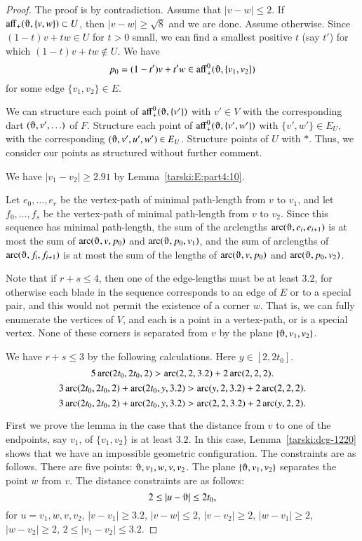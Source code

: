 \begin{proof}
The proof is by contradiction.  Assume that $|v-w|\le 2$.
If $\op{aff}_+(\orgn,\{v,w\})\subset U$, then $|v-w|\ge\sqrt8$ and
we are done.  Assume otherwise.  Since $(1-t)v + t w\in U$ for $t>0$
small, we can find a smallest positive $t$ (say $t'$) for which
$(1-t)v + t w\not\in U$.  We have
$$p_0 = (1-t') v + t' w \in \op{aff}_+^0(\orgn,\{v_1,v_2\})$$
for some edge $\{v_1,v_2\}\in E$.

We can structure each point of $\op{aff}^0_+(\orgn,\{v'\})$ with
$v'\in V$ with the corresponding dart $(\orgn,v',\ldots)$ of $F$.
Structure each point of $\op{aff}_+^0(\orgn,\{v',w'\})$ with
$\{v',w'\}\in E_U$, with the corresponding $(\orgn,v',u',w')\in E_U$.
Structure points of $U$ with $*$. Thus, we consider our points as
structured without further comment.


We have $|v_1-v_2|\ge2.91$ by Lemma~\ref{tarski:E:part4:10}.

Let $e_0,\ldots,e_r$ be the  vertex-path of minimal path-length from $v$ to
$v_1$, and let $f_0,\ldots,f_s$ be the  vertex-path of minimal path-length from
$v$ to $v_2$. Since this sequence has minimal path-length, the
sum of the arclengths $\arc(\orgn,e_i,e_{i+1})$ is at most the sum of 
$\arc(\orgn,v,p_0)$ and $\arc(\orgn,p_0,v_1)$, and the sum of arclengths of $\arc(\orgn,f_i,f_{i+1})$
is at most the sum of the lengths of $\arc(\orgn,v,p_0)$ and $\arc(\orgn,p_0,v_2)$.

Note that if $r+s\le4$, then one of the edge-lengths must be at
least $3.2$, for otherwise each blade in the sequence corresponds to
an 
edge of $E$ or to a special pair, and this would not permit
the existence of a corner $w$. That is, we can fully enumerate the
vertices of $V$, and each is a
point in a vertex-path, or is a special vertex.
None of these corners is separated from $v$ by the plane
$\{\orgn,v_1,v_2\}$.

We have $r+s\le3$ by the following calculations.  Here
$y\in[2,2t_0]$.
    $$5\operatorname{arc}(2t_0,2t_0,2) > \operatorname{arc}(2,2,3.2)+ 2 \operatorname{arc}(2,2,2).$$
    $$3\operatorname{arc}(2t_0,2t_0,2) + \operatorname{arc}(2t_0,y,3.2) > \operatorname{arc}(y,2,3.2) + 2 \operatorname{arc}(2,2,2).$$
    $$3\operatorname{arc}(2t_0,2t_0,2) + \operatorname{arc}(2t_0,y,3.2) > \operatorname{arc}(2,2,3.2) + 2\operatorname{arc}(y,2,2).$$


First we prove the lemma in the case that the distance from
$v$ to one of the endpoints, say $v_1$, of $\{v_1,v_2\}$ is at least
$3.2$. In this case, Lemma~\ref{tarski:dcg-1220} shows
that we have an
impossible geometric configuration. The
constraints are as follows.  There are five points: $\orgn,v_1,w,v,v_2$.
The plane $\{\orgn,v_1,v_2\}$ separates the point $w$ from $v$. The
distance constraints are as follows:
    $$2\le |u-\orgn| \le 2t_0,$$
for $u=v_1,w,v,v_2$, $|v-v_1|\ge 3.2$, $|v-w|\le2$, $|v-v_2|\ge2$,
$|w-v_1|\ge2$, $|w-v_2|\ge2$, $2\le |v_1-v_2|\le 3.2$.


\end{proof}
